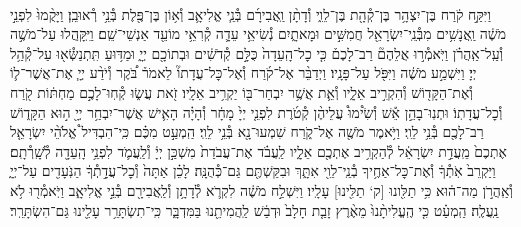 \documentclass[twoside, openany, parskip=half, 11pt]{book}
\begin{document}
\begin{footnotesize}
\begin{multicols}{2}
\\
וַיִּקַּ֣ח קֹ֔רַח בֶּן־יִצְהָ֥ר בֶּן־קְ֯הָ֖ת בֶּן־לֵוִ֑י וְ֯דָתָ֨ן וַֽאֲבִירָ֜ם בְּ֯נֵ֧י אֱלִיאָ֛ב וְ֯א֥וֹן בֶּן־פֶּ֖לֶת בְּ֯נֵ֥י רְ֯אוּבֵֽן׃ וַיָּקֻ֨מוּ֙ לִפְנֵ֣י מֹשֶׁ֔ה וַֽאֲנָשִׁ֥ים מִבְּ֯נֵֽי־יִשְׂרָאֵ֖ל חֲמִשִּׁ֣ים וּמָאתָ֑יִם נְ֯שִׂיאֵ֥י עֵדָ֛ה קְ֯רִאֵ֥י מוֹעֵ֖ד אַנְשֵׁי־שֵֽׁם׃ וַיִּֽקָּֽהֲלוּ עַל־מֹשֶׁ֣ה וְ֯עַֽל־אַֽהֲרֹ֗ן וַיֹּֽאמְ֯ר֣וּ אֲלֵהֶם֘ רַב־לָכֶם֒ כִּ֤י כׇל־הָֽעֵדָה֙ כֻּלָּ֣ם קְ֯דֹשִׁ֔ים וּבְתוֹכָ֖ם יְיָ֑ וּמַדּ֥וּעַ תִּֽתְנַשְּׂ֯א֖וּ עַל־קְ֯הַ֥ל יְיָ׃  וַיִּשְׁמַ֣ע מֹשֶׁ֔ה וַיִּפֹּ֖ל עַל־פָּנָֽיו׃ וַיְדַבֵּ֨ר אֶל־קֹ֜רַח וְ֯אֶל־כׇּל־עֲדָתוֹ֘ לֵאמֹר֒ בֹּ֠קֶר וְ֯יֹדַ֨ע יְיָ֧ אֶת־אֲשֶׁר־ל֛וֹ וְ֯אֶת־הַקָּד֖וֹשׁ וְ֯הִקְרִ֣יב אֵלָ֑יו וְ֯אֵ֛ת אֲשֶׁ֥ר יִבְחַר־בּ֖וֹ יַקְרִ֥יב אֵלָֽיו׃ זֹ֖את עֲשׂ֑וּ קְ֯חֽוּ־לָכֶ֣ם מַחְתּ֔וֹת קֹ֖רַח וְ֯כׇל־עֲדָתֽוֹ׃ וּתְנֽוּ־בָהֵ֣ן אֵ֡שׁ וְ֯שִׂ֩ימוּ֩ עֲלֵיהֶ֨ן קְ֯טֹ֜רֶת לִפְנֵ֤י יְיָ֙ מָחָ֔ר וְ֯הָיָ֗ה הָאִ֛ישׁ אֲשֶׁר־יִבְחַ֥ר יְיָ֖ ה֣וּא הַקָּד֑וֹשׁ רַב־לָכֶ֖ם בְּ֯נֵ֥י לֵוִֽי׃  וַיֹּ֥אמֶר מֹשֶׁ֖ה אֶל־קֹ֑רַח שִׁמְעוּ־נָ֖א בְּ֯נֵ֥י לֵוִֽי׃ הַֽמְעַ֣ט מִכֶּ֗ם כִּֽי־הִבְדִּיל֩ אֱלֹהֵ֨י יִשְׂרָאֵ֤ל אֶתְכֶם֙ מֵֽעֲדַ֣ת יִשְׂרָאֵ֔ל לְ֯הַקְרִ֥יב אֶתְכֶ֖ם אֵלָ֑יו לַֽעֲבֹ֗ד אֶת־עֲבֹדַת֙ מִשְׁכַּ֣ן יְיָ֔ וְ֯לַֽעֲמֹ֛ד לִפְנֵ֥י הָֽעֵדָ֖ה לְ֯שָֽׁרְ֯תָֽם׃ וַיַּקְרֵב֙ אֹֽתְ֯ךָ֔ וְ֯אֶת־כׇּל־אַחֶ֥יךָ בְ֯נֵֽי־לֵוִ֖י אִתָּ֑ךְ וּבִקַּשְׁתֶּ֖ם גַּם־כְּ֯הֻנָּֽה׃ לָכֵ֗ן אַתָּה֙ וְ֯כׇל־עֲדָ֣תְ֯ךָ֔ הַנֹּֽעָדִ֖ים עַל־יְיָ֑ וְ֯אַֽהֲרֹ֣ן מַה־ה֔וּא כִּ֥י תַלִּ֖ונוּ [ק‘ תַלִּ֖ינוּ] עָלָֽיו׃ וַיִּשְׁלַ֣ח מֹשֶׁ֔ה לִקְרֹ֛א לְ֯דָתָ֥ן וְ֯לַֽאֲבִירָ֖ם בְּ֯נֵ֣י אֱלִיאָ֑ב וַיֹּֽאמְ֯ר֖וּ לֹ֥א נַֽעֲלֶֽה׃ הַֽמְעַ֗ט כִּ֤י הֶֽעֱלִיתָ֨נוּ֙ מֵאֶ֨רֶץ זָבַ֤ת חָלָב֙ וּדְבַ֔שׁ לַֽהֲמִיתֵ֖נוּ בַּמִּדְבָּ֑ר כִּֽי־תִשְׂתָּרֵ֥ר עָלֵ֖ינוּ גַּם־הִשְׂתָּרֵֽר׃


\end{multicols}
\end{footnotesize}
\end{document}
